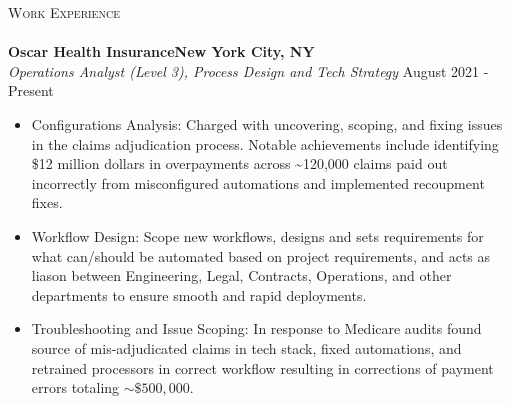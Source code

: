\documentclass[a4paper]{article}
\newcommand{\lineunder} {
    \vspace*{-8pt} \\
    \hspace*{-18pt} \hrulefill \\
}
\newcommand{\header} [1] {
    {\hspace*{-18pt}\vspace*{6pt} \textsc{#1}}
    \vspace*{-6pt} \lineunder
}
\begin{document}
\header{Work Experience}
\vspace{1mm}
\textbf{Oscar Health Insurance\hfill New York City, NY}\\
\textit{Operations Analyst (Level 3), Process Design and Tech Strategy} \hfill August 2021 - Present\\
\vspace{-1mm}
\begin{itemize} \itemsep 1pt
    \item Configurations Analysis: Charged with uncovering, scoping, and fixing issues in the claims adjudication process. 
        Notable achievements include identifying \$12 million dollars in overpayments across \textasciitilde{}120,000 claims paid out incorrectly 
        from misconfigured automations and implemented recoupment fixes.

    \item   Workflow Design: Scope new workflows, designs and sets requirements for what can/should be automated based on project requirements,
     and acts as liason between Engineering, Legal, Contracts, Operations, and other departments to ensure smooth and rapid deployments.

	\item 	Troubleshooting and Issue Scoping: In response to Medicare audits found source of mis-adjudicated claims in tech stack, fixed automations, and retrained processors in correct workflow resulting in corrections of payment errors totaling $\sim\$500,000$.
\end{itemize}
\end{document}
